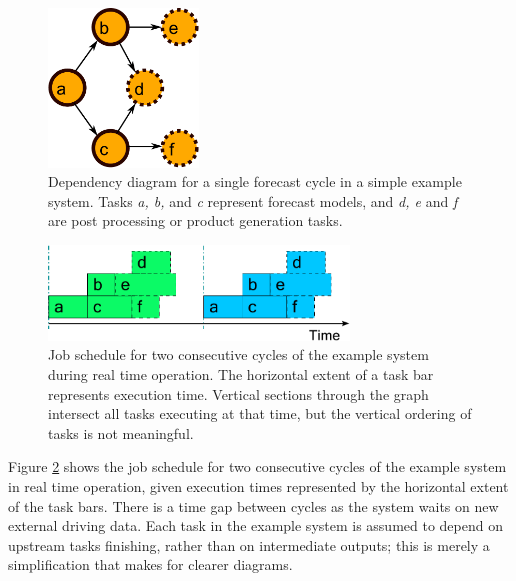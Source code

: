 \documentclass[11pt,a4paper]{article}
\begin{document}
\begin{figure} 
    \begin{center}
    \includegraphics[width=4cm]{dependencies-one} 
    \end{center}
    \caption{\small Dependency diagram for a single forecast cycle in a
    simple example system. Tasks {\em a, b,} and {\em c} represent
    forecast models, and {\em d, e} and {\em f} are post processing or
    product generation tasks.} 
    \label{fig-dep-one} 
\end{figure} 

\begin{figure}
    \begin{center}
        \includegraphics[width=8cm]{timeline-one}
    \end{center}
    \caption{\small Job schedule for two consecutive cycles of
the example system during real time operation. The horizontal extent of
a task bar represents execution time. Vertical sections through the
graph intersect all tasks executing at that time, but the vertical
ordering of tasks is not meaningful.}
    \label{fig-time-one}
\end{figure}

Figure \ref{fig-time-one} shows the job schedule for two consecutive
cycles of the example system in real time operation, given execution
times represented by the horizontal extent of the task bars. There is a
time gap between cycles as the system waits on new external driving
data.  Each task in the example system is assumed to depend on upstream
tasks finishing, rather than on intermediate outputs; this is merely 
a simplification that makes for clearer diagrams.
\end{document}
